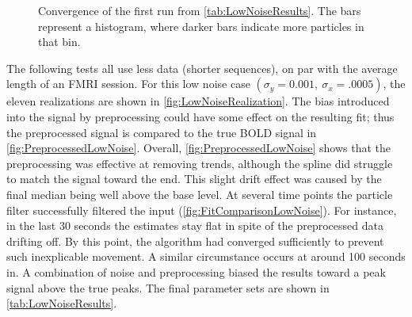 \begin{figure}
\caption{Convergence of the first run from \autoref{tab:LowNoiseResults}. The bars represent
a histogram, where darker bars indicate more particles in that bin.}
\label{fig:LowNoiseHist}
\end{figure}

The following tests all use less data (shorter sequences), on par with
the average length of an FMRI session. For this low noise case
$(\sigma_y = 0.001,\ \sigma_x = .0005)$, the eleven realizations are shown in
\autoref{fig:LowNoiseRealization}.
The bias introduced into the signal by preprocessing
could have some effect on the resulting fit; thus the preprocessed signal is compared
to the true BOLD signal in \autoref{fig:PreprocessedLowNoise}.
Overall, \autoref{fig:PreprocessedLowNoise} shows that the preprocessing was
effective at removing trends, although the spline did struggle to match the signal
toward the end. This slight drift effect was caused by the final median being
well above the base
level.
At several time points the particle filter successfully filtered the input
(\autoref{fig:FitComparisonLowNoise}).
For instance, in the last 30 seconds
the estimates stay flat in spite of the preprocessed data drifting off. By
this point, the algorithm had converged sufficiently to prevent such inexplicable movement.
A similar circumstance occurs at around 100 seconds in. A combination of
noise and preprocessing biased the results toward a peak signal above the true peaks.
The final parameter sets are shown in
\autoref{tab:LowNoiseResults}.


